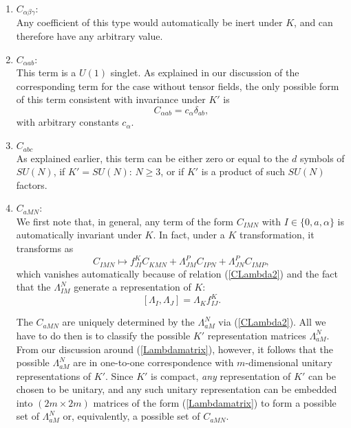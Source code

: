 \documentclass[a4paper,11pt]{article}
\begin{document}
\begin{enumerate}
\item $C_{\alpha \beta \gamma}$:\\
Any coefficient of this type would automatically be inert under $K$, and
can therefore have any arbitrary value.
\item $C_{\alpha ab}$:\\
This term is a $U(1)$ singlet. As explained in our discussion of
the corresponding term for the case without tensor fields, the
only possible form of this term consistent with invariance under
$K'$ is
\begin{displaymath}
C_{\alpha ab}=c_{\alpha}\delta_{ab},
\end{displaymath}
with arbitrary constants $c_{\alpha}$.

\item $C_{abc}$\\
As explained earlier, this term can be either zero or equal to the
$d$ symbols of $SU(N)$, if $K'=SU(N)$: $N\geq 3$, or if $K'$ is a
product of such $SU(N)$ factors.

\item $C_{aMN}$:\\
We first note that, in general,
any term of the form $C_{IMN}$ with $I\in \{ 0,a,\alpha\}$
is automatically invariant under $K$. In fact, under a $K$
transformation, it transforms as
\begin{displaymath}
C_{IMN}\longmapsto
f_{JI}^{K}C_{KMN}+\Lambda_{JM}^{P}C_{IPN}+\Lambda_{JN}^{P}C_{IMP},
\end{displaymath}
which vanishes automatically because of relation (\ref{CLambda2})
and the fact that the $\Lambda_{IM}^{N}$ generate a representation
of $K$:
\begin{equation}\label{commutator}
[\Lambda_{I},\Lambda_{J}]=\Lambda_{K}f_{IJ}^{K}.
\end{equation}

The  $C_{aMN}$ are uniquely determined by the $\Lambda_{aM}^{N}$
via (\ref{CLambda2}). All we have to do then is  to classify the
possible $K'$ representation matrices $\Lambda_{aM}^{N}$. From our
discussion around (\ref{Lambdamatrix}), however, it follows
that the possible $\Lambda_{aM}^{N}$ are in one-to-one
correspondence with $m$-dimensional unitary representations of
$K'$. Since $K'$ is compact, \emph{any} representation
of $K'$ can be chosen to be unitary, and any such unitary
representation can be embedded into $(2m\times 2m)$ matrices of
the form (\ref{Lambdamatrix}) to form a possible set of
$\Lambda_{aM}^{N}$ or, equivalently, a possible set of $C_{aMN}$.


\end{enumerate}
\end{document}
